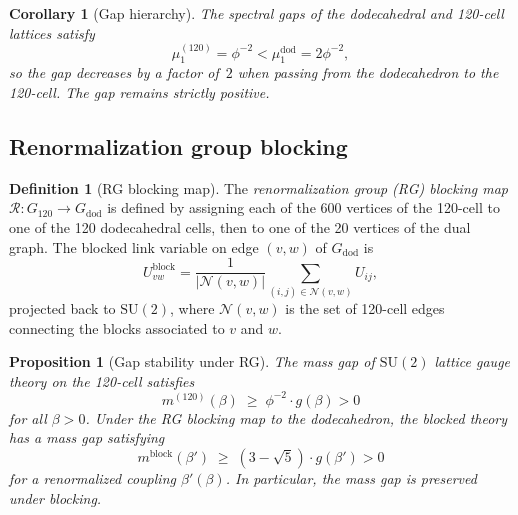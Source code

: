 \documentclass[12pt,a4paper]{article}
\newtheorem{proposition}[theorem]{Proposition}
\newtheorem{corollary}[theorem]{Corollary}
\theoremstyle{definition}
\newtheorem{definition}[theorem]{Definition}
\theoremstyle{remark}
\newcommand{\SU}{\mathrm{SU}}
\newcommand{\ph}{\phi}
\begin{document}
\begin{corollary}[Gap hierarchy]\label{cor:gaphierarchy}
The spectral gaps of the dodecahedral and 120-cell lattices satisfy
\begin{equation}\label{eq:gaphierarchy}
  \mu_1^{(120)} = \ph^{-2} < \mu_1^{\mathrm{dod}} = 2\ph^{-2},
\end{equation}
so the gap \emph{decreases} by a factor of~$2$ when passing from the
dodecahedron to the 120-cell.  The gap remains strictly positive.
\end{corollary}

\subsection{Renormalization group blocking}\label{ssec:rg}

\begin{definition}[RG blocking map]\label{def:rg}
The \emph{renormalization group (RG) blocking map}
$\mathcal{R}: G_{120} \to G_{\mathrm{dod}}$ is defined by assigning each
of the 600 vertices of the 120-cell to one of the 120 dodecahedral cells,
then to one of the 20 vertices of the dual graph.  The blocked link
variable on edge $(v,w)$ of $G_{\mathrm{dod}}$ is
\begin{equation}\label{eq:blocking}
  U_{vw}^{\mathrm{block}} = \frac{1}{|\mathcal{N}(v,w)|}
  \sum_{(i,j) \in \mathcal{N}(v,w)} U_{ij},
\end{equation}
projected back to $\SU(2)$, where $\mathcal{N}(v,w)$ is the set of
120-cell edges connecting the blocks associated to $v$ and $w$.
\end{definition}

\begin{proposition}[Gap stability under RG]\label{prop:rgstability}
The mass gap of $\SU(2)$ lattice gauge theory on the 120-cell satisfies
\begin{equation}\label{eq:rgbound}
  m^{(120)}(\beta) \;\ge\; \ph^{-2} \cdot g(\beta) > 0
\end{equation}
for all $\beta > 0$.  Under the RG blocking map to the dodecahedron,
the blocked theory has a mass gap satisfying
\begin{equation}\label{eq:blockedgap}
  m^{\mathrm{block}}(\beta') \;\ge\; (3 - \sqrt{5}) \cdot g(\beta') > 0
\end{equation}
for a renormalized coupling $\beta'(\beta)$.  In particular, the mass
gap is preserved under blocking.
\end{proposition}
\end{document}
